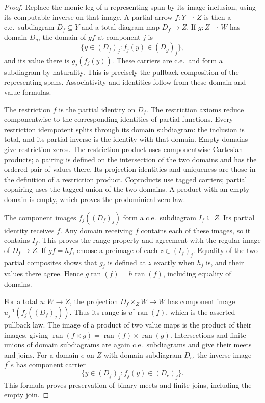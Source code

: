 \documentclass[11pt]{article}
\newcommand{\ran}{\operatorname{ran}}
\begin{document}
\begin{proof}
Replace the monic leg of a representing span by its image
inclusion, using its computable inverse on that image. A partial
arrow $f:Y\rightharpoonup Z$ is then a c.e.\ subdiagram
$D_f\subseteq Y$ and a total diagram map $D_f\to Z$.
If $g:Z\rightharpoonup W$ has domain $D_g$, the domain of $gf$
at component $j$ is
\[
 \{y\in(D_f)_j:f_j(y)\in(D_g)_j\},
\]
and its value there is $g_j(f_j(y))$. These carriers are c.e.\
and form a subdiagram by naturality. This is precisely the
pullback composition of the representing spans. Associativity
and identities follow from these domain and value formulas.

The restriction $\bar f$ is the partial identity on $D_f$.
The restriction axioms reduce componentwise to the corresponding
identities of partial functions. Every restriction idempotent
splits through its domain subdiagram: the inclusion is total,
and its partial inverse is the identity with that domain.
Empty domains give restriction zeros. The restriction product
uses componentwise Cartesian products; a pairing is defined on
the intersection of the two domains and has the ordered pair
of values there. Its projection identities and uniqueness are
those in the definition of a restriction product. Coproducts
use tagged carriers; partial copairing uses the tagged union
of the two domains. A product with an empty domain is empty,
which proves the prodominical zero law.

The component images $f_j((D_f)_j)$ form a c.e.\ subdiagram
$I_f\subseteq Z$. Its partial identity receives $f$. Any domain
receiving $f$ contains each of these images, so it contains $I_f$.
This proves the range property and agreement with the regular
image of $D_f\to Z$. If $gf=hf$, choose a preimage of each
$z\in(I_f)_j$. Equality of the two partial composites shows
that $g_j$ is defined at $z$ exactly when $h_j$ is, and their
values there agree. Hence $g\ran(f)=h\ran(f)$, including
equality of domains.

For a total $u:W\to Z$, the projection
$D_f\times_Z W\to W$ has component image
$u_j^{-1}(f_j((D_f)_j))$. Thus its range is $u^*\ran(f)$,
which is the asserted pullback law. The image of a product
of two value maps is the product of their images, giving
$\ran(f\times g)=\ran(f)\times\ran(g)$.
Intersections and finite unions of domain subdiagrams are again
c.e.\ subdiagrams and give their meets and joins. For a domain
$e$ on $Z$ with domain subdiagram $D_e$, the inverse image $f^*e$
has component carrier
\[
 \{y\in(D_f)_j:f_j(y)\in(D_e)_j\}.
\]
This formula proves preservation of binary meets and finite joins,
including the empty join.


\end{proof}
\end{document}
